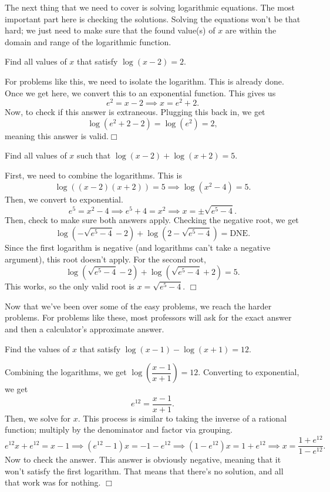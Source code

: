 \documentclass[lang=en,11pt]{elegantbook}
\begin{document}
The next thing that we need to cover is solving logarithmic equations.  The most important part here is checking the solutions.  Solving the equations won't be that hard; we just need to make sure that the found value(s) of $x$ are within the domain and range of the logarithmic function.
\begin{example}
Find all values of $x$ that satisfy $\log(x-2)=2$.
\end{example}
\begin{solution}
For problems like this, we need to isolate the logarithm.  This is already done.  Once we get here, we convert this to an exponential function.  This gives us $$e^2=x-2 \implies x=e^2+2.$$ 
Now, to check if this answer is extraneous.  Plugging this back in, we get $$\log(e^2+2-2)=\log(e^2)=2,$$ meaning this answer is valid.$\Box$
\end{solution}
\begin{example}
Find all values of $x$ such that $\log(x-2)+\log(x+2)=5$.
\end{example}
\begin{solution}
First, we need to combine the logarithms.  This is $$\log\left((x-2)(x+2)\right)=5 \implies \log(x^2-4)=5.$$  Then, we convert to exponential.  $$e^5=x^2-4 \implies e^5+4=x^2 \implies x=\pm\sqrt{e^5-4}.$$
Then, check to make sure both answers apply.  Checking the negative root, we get $$\log(-\sqrt{e^5-4}-2)+\log(2-\sqrt{e^5-4})=\text{DNE}.$$  Since the first logarithm is negative (and logarithms can't take a negative argument), this root doesn't apply.  For the second root, $$\log(\sqrt{e^5-4}-2)+\log(\sqrt{e^5-4}+2)=5.$$  This works, so the only valid root is $x=\sqrt{e^5-4}.$ $\Box$
\end{solution}
Now that we've been over some of the easy problems, we reach the harder problems.  For problems like these, most professors will ask for the exact answer and then a calculator's approximate answer.  
\begin{example}
Find the values of $x$ that satisfy $\log(x-1)-\log(x+1)=12$.
\end{example}
\begin{solution}
Combining the logarithms, we get $\log\left(\dfrac{x-1}{x+1}\right)=12.$  Converting to exponential, we get $$e^{12}=\dfrac{x-1}{x+1}.$$  Then, we solve for $x$.  This process is similar to taking the inverse of a rational function; multiply by the denominator and factor via grouping.
$$e^{12}x+e^{12}=x-1 \implies (e^{12}-1)x=-1-e^{12} \implies (1-e^{12})x=1+e^{12} \implies x=\dfrac{1+e^{12}}{1-e^{12}}.$$
Now to check the answer.  This answer is obviously negative, meaning that it won't satisfy the first logarithm.  That means that there's no solution, and all that work was for nothing. $\Box$
\end{solution}
\end{document}
